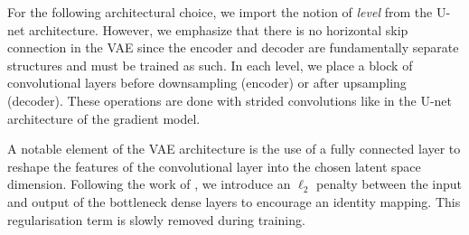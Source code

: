 \documentclass[twocolumn]{aastex631}
\begin{document}
For the following architectural choice, we import the notion of \textit{level} from the
U-net architecture. However, we emphasize that there is no horizontal skip connection 
in the VAE since the encoder and decoder are fundamentally separate structures and 
must be trained as such. In each level, we place a block of convolutional layers 
before downsampling (encoder) or after upsampling (decoder). These operations 
are done with strided convolutions like in the U-net architecture of the gradient 
model.

A notable element of the VAE architecture is the use of a fully connected  
layer to reshape the features of the convolutional layer into the chosen 
latent space dimension. Following the work of \citet{Lanusse2021}, we introduce 
an $\ell_{2}$ penalty between the input and output of the bottleneck 
dense layers to encourage an identity mapping. This regularisation 
term is slowly removed during training.
\end{document}
